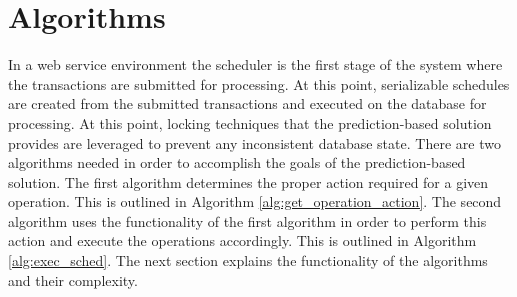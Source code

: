 \documentclass[conference]{IEEEtran}
\begin{document}
\section{Algorithms}
\label{sec:algorithms}
In a web service environment the scheduler is the first stage of the system where the transactions are submitted for processing. At this point, serializable schedules are created from the submitted transactions and executed on the database for processing. At this point, locking techniques that the prediction-based solution provides are leveraged to prevent any inconsistent database state. There are two algorithms needed in order to accomplish the goals of the prediction-based solution. The first algorithm determines the proper action required for a given operation. This is outlined in Algorithm \ref{alg:get_operation_action}. The second algorithm uses the functionality of the first algorithm in order to perform this action and execute the operations accordingly. This is outlined in Algorithm \ref{alg:exec_sched}. The next section explains the functionality of the algorithms and their complexity.

\end{document}
